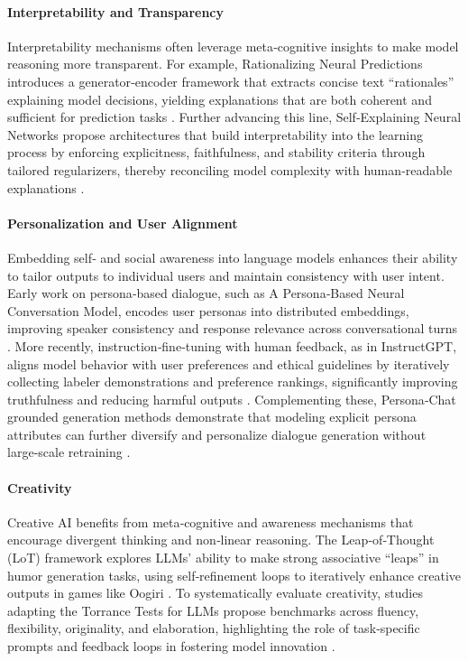 \paragraph{Interpretability and Transparency}

Interpretability mechanisms often leverage meta‑cognitive insights to make model reasoning more transparent. For example, Rationalizing Neural Predictions introduces a generator‑encoder framework that extracts concise text ``rationales'' explaining model decisions, yielding explanations that are both coherent and sufficient for prediction tasks \citep{lei2016rationalizing}.
Further advancing this line, Self‑Explaining Neural Networks propose architectures that build interpretability into the learning process by enforcing explicitness, faithfulness, and stability criteria through tailored regularizers, thereby reconciling model complexity with human‑readable explanations \citep{alvarez2018towards}.

\paragraph{Personalization and User Alignment}

Embedding self‑ and social awareness into language models enhances their ability to tailor outputs to individual users and maintain consistency with user intent. Early work on persona‑based dialogue, such as A Persona‑Based Neural Conversation Model, encodes user personas into distributed embeddings, improving speaker consistency and response relevance across conversational turns \citep{li2016persona}.
More recently, instruction‑fine‑tuning with human feedback, as in InstructGPT, aligns model behavior with user preferences and ethical guidelines by iteratively collecting labeler demonstrations and preference rankings, significantly improving truthfulness and reducing harmful outputs \citep{ouyang2022training}.
Complementing these, Persona‑Chat grounded generation methods demonstrate that modeling explicit persona attributes can further diversify and personalize dialogue generation without large‑scale retraining \citep{song2019exploiting}.

\paragraph{Creativity}

Creative AI benefits from meta‑cognitive and awareness mechanisms that encourage divergent thinking and non‑linear reasoning. The Leap‑of‑Thought (LoT) framework explores LLMs’ ability to make strong associative ``leaps'' in humor generation tasks, using self‑refinement loops to iteratively enhance creative outputs in games like Oogiri \citep{zhong2024let}.
To systematically evaluate creativity, studies adapting the Torrance Tests for LLMs propose benchmarks across fluency, flexibility, originality, and elaboration, highlighting the role of task‑specific prompts and feedback loops in fostering model innovation \citep{zhao2024assessing}.

